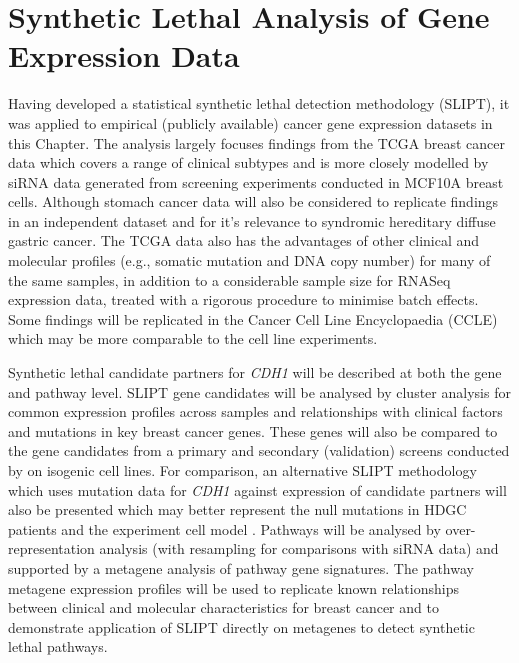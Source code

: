 \chapter{Synthetic Lethal Analysis of Gene Expression Data}
\label{chap:SLIPT}

Having developed a statistical synthetic lethal detection methodology (\gls{SLIPT}), it was applied to empirical (publicly available) cancer gene expression datasets in this Chapter. The analysis largely focuses findings from the TCGA breast cancer data \citep{TCGA2012} which covers a range of clinical subtypes and is more closely modelled by \gls{siRNA} data \citep{Telford2015} generated from screening experiments conducted in MCF10A breast cells. Although stomach cancer data will also be considered to replicate findings in an independent dataset and for it's relevance to syndromic hereditary diffuse gastric cancer. The TCGA data also has the advantages of other clinical and molecular profiles (e.g., somatic mutation and DNA copy number) for many of the same samples, in addition to a considerable sample size for RNASeq expression data, treated with a rigorous procedure to minimise batch effects. Some findings will be replicated in the Cancer Cell Line Encyclopaedia (CCLE) \citep{Barretina2012} which may be more comparable to the cell line experiments.

Synthetic lethal candidate partners for \textit{CDH1} will be described at both the gene and pathway level. \gls{SLIPT} gene candidates will be analysed by cluster analysis for common expression profiles across samples and relationships with clinical factors and mutations in key breast cancer genes. These genes will also be compared to the gene candidates from a primary and secondary (validation) screens conducted by \citet{Telford2015} on isogenic cell lines. For comparison, an alternative \gls{SLIPT} methodology which uses mutation data for \textit{CDH1} against expression of candidate partners will also be presented which may better represent the null mutations in HDGC patients and the experiment cell model \citep{Chen2014}. Pathways will be analysed by over-representation analysis (with resampling for comparisons with \gls{siRNA} data) and supported by a metagene analysis of pathway gene signatures. The pathway metagene expression profiles will be used to replicate known relationships between clinical and molecular characteristics for breast cancer and to demonstrate application of \gls{SLIPT} directly on metagenes to detect synthetic lethal pathways.

